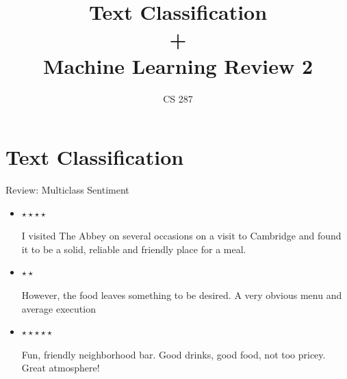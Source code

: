 \documentclass{beamer}
\title{Text Classification\\ + \\ Machine Learning Review 2 }
\date{}
\author{CS 287}
\begin{document}
\begin{frame}
  \titlepage
\end{frame}

\section{Text Classification }

\begin{frame}{Review: Multiclass Sentiment}
    \begin{itemize}
    \item 
      $\star \star \star \star$

      I visited The Abbey on several occasions on a visit to Cambridge and found it to be a solid, reliable and friendly place for a meal.
      
    \item $\star \star$ 

      However, the food leaves something to be desired. A very obvious menu and average execution

    \item $\star \star \star \star \star$

      Fun, friendly neighborhood bar. Good drinks, good food, not too pricey. Great atmosphere!
  \end{itemize}
\end{frame}
\end{document}
